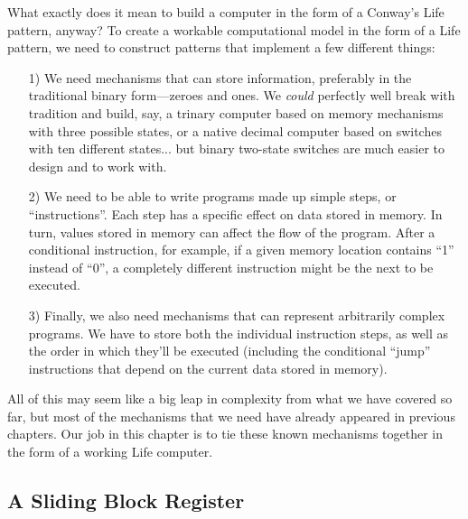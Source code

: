What exactly does it mean to build a computer in the form of a Conway's Life pattern, anyway? To create a workable computational model in the form of a Life pattern, we need to construct patterns that implement a few different things:\smallskip

\begin{enumerate}
	\item[1)] We need mechanisms that can store information, preferably in the traditional binary form---zeroes and ones. We \emph{could} perfectly well break with tradition and build, say, a trinary computer based on memory mechanisms with three possible states, or a native decimal computer based on switches with ten different states... but binary two-state switches are much easier to design and to work with.\smallskip
	
	\item[2)] We need to be able to write programs made up simple steps, or ``instructions''. Each step has a specific effect on data stored in memory. In turn, values stored in memory can affect the flow of the program.  After a conditional instruction, for example, if a given memory location contains ``1'' instead of ``0'', a completely different instruction might be the next to be executed.\smallskip
	
	\item[3)] Finally, we also need mechanisms that can represent arbitrarily complex programs. We have to store both the individual instruction steps, as well as the order in which they'll be executed (including the conditional ``jump'' instructions that depend on the current data stored in memory).\smallskip
\end{enumerate}

All of this may seem like a big leap in complexity from what we have covered so far, but most of the mechanisms that we need have already appeared in previous chapters. Our job in this chapter is to tie these known mechanisms together in the form of a working Life computer.


\subsection{A Sliding Block Register}\label{sec:sliding_block_register}

